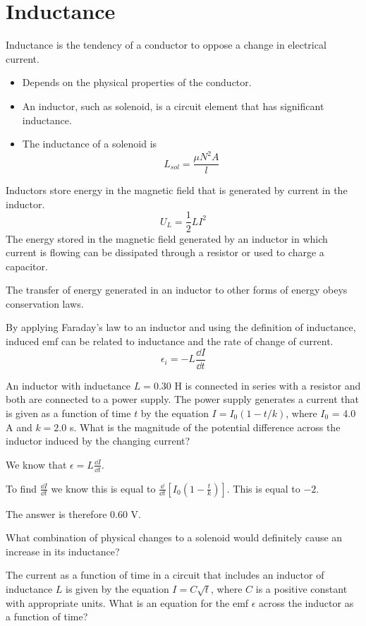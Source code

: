 \documentclass[../em.tex]{subfiles}
\begin{document}
\section{Inductance}
Inductance is the tendency of a conductor to oppose a change in electrical current.
\begin{itemize}
    \item Depends on the physical properties of the conductor.
    \item An inductor, such as solenoid, is a circuit element that has significant inductance.
    \item The inductance of a solenoid is 
    \[ L_{sol} = \frac{\mu N^2 A}{l} \]
\end{itemize}

Inductors store energy in the magnetic field that is generated by current in the inductor.
\[ U_L = \frac{1}{2}LI^2 \]
The energy stored in the magnetic field generated by an inductor in which current is flowing can be dissipated through a resistor or used to charge a capacitor.

The transfer of energy generated in an inductor to other forms of energy obeys conservation laws.

By applying Faraday's law to an inductor and using the definition of inductance, induced emf can be related to inductance and the rate of change of current.
\[ \epsilon_i = -L \frac{\dd I}{\dd t} \]
\pagebreak
\begin{example}
    An inductor with inductance $L=0.30$ H is connected in series with a resistor and both are connected to a power supply. The power supply generates a current that is given as a function of time $t$
    by the equation $I=I_0(1-t/k)$, where $I_0$ = 4.0 A and $k=2.0$ s. What is the magnitude of the potential difference across the inductor induced by the changing current?

    We know that $\epsilon = L\frac{\dd I}{\dd t}$. 

    To find $\frac{\dd I}{\dd t}$ we know this is equal to $\frac{\dd}{\dd t}\left[ I_0\left(1-\frac{t}{k}\right)\right]$. This is equal to $-2$.

    The answer is therefore $0.60$ V.
\end{example}

\ex What combination of physical changes to a solenoid would definitely cause an increase in its inductance?

\ex The current as a function of time in a circuit that includes an inductor of inductance $L$ is given by the equation $I=C\sqrt{t}$, where $C$ is a positive constant with appropriate units.
What is an equation for the emf $\epsilon$ across the inductor as a function of time?
\end{document}
